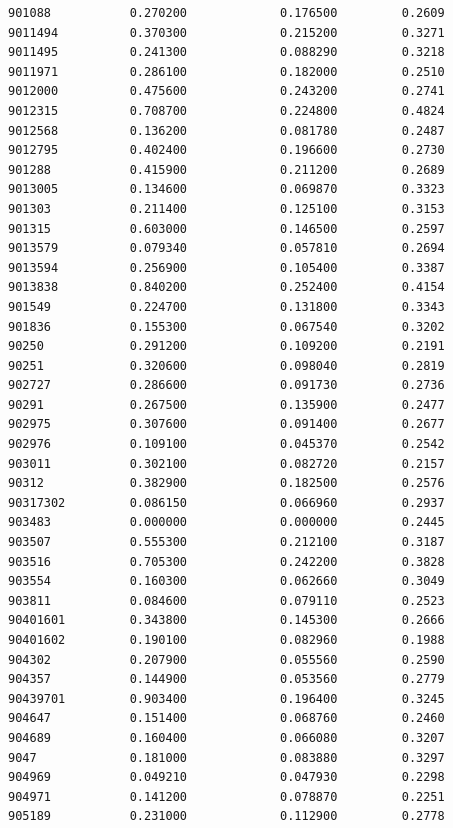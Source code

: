 \documentclass[
  letterpaper,
  DIV=11,
  numbers=noendperiod]{scrartcl}
\begin{document}
\begin{verbatim}
901088           0.270200             0.176500         0.2609
9011494          0.370300             0.215200         0.3271
9011495          0.241300             0.088290         0.3218
9011971          0.286100             0.182000         0.2510
9012000          0.475600             0.243200         0.2741
9012315          0.708700             0.224800         0.4824
9012568          0.136200             0.081780         0.2487
9012795          0.402400             0.196600         0.2730
901288           0.415900             0.211200         0.2689
9013005          0.134600             0.069870         0.3323
901303           0.211400             0.125100         0.3153
901315           0.603000             0.146500         0.2597
9013579          0.079340             0.057810         0.2694
9013594          0.256900             0.105400         0.3387
9013838          0.840200             0.252400         0.4154
901549           0.224700             0.131800         0.3343
901836           0.155300             0.067540         0.3202
90250            0.291200             0.109200         0.2191
90251            0.320600             0.098040         0.2819
902727           0.286600             0.091730         0.2736
90291            0.267500             0.135900         0.2477
902975           0.307600             0.091400         0.2677
902976           0.109100             0.045370         0.2542
903011           0.302100             0.082720         0.2157
90312            0.382900             0.182500         0.2576
90317302         0.086150             0.066960         0.2937
903483           0.000000             0.000000         0.2445
903507           0.555300             0.212100         0.3187
903516           0.705300             0.242200         0.3828
903554           0.160300             0.062660         0.3049
903811           0.084600             0.079110         0.2523
90401601         0.343800             0.145300         0.2666
90401602         0.190100             0.082960         0.1988
904302           0.207900             0.055560         0.2590
904357           0.144900             0.053560         0.2779
90439701         0.903400             0.196400         0.3245
904647           0.151400             0.068760         0.2460
904689           0.160400             0.066080         0.3207
9047             0.181000             0.083880         0.3297
904969           0.049210             0.047930         0.2298
904971           0.141200             0.078870         0.2251
905189           0.231000             0.112900         0.2778

\end{verbatim}
\end{document}
